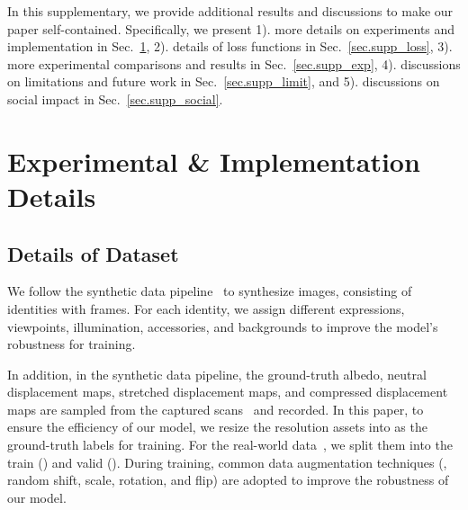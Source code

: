 


In this supplementary, we provide additional results and discussions to make our paper self-contained. Specifically, we present 1). more details on experiments and implementation in Sec.~\ref{sec.supp_imp}, 2). details of loss functions in Sec.~\ref{sec.supp_loss}, 3). more experimental comparisons and results in Sec.~\ref{sec.supp_exp}, 4). discussions on limitations and future work in Sec.~\ref{sec.supp_limit}, and 5). discussions on social impact in Sec.~\ref{sec.supp_social}.



\section{Experimental \& Implementation Details} \label{sec.supp_imp}


\subsection{Details of Dataset}

We follow the synthetic data pipeline~ to synthesize  images, consisting of  identities with  frames. For each identity, we assign different expressions, viewpoints, illumination, accessories, and backgrounds to improve the model's robustness for training.

In addition, in the synthetic data pipeline, the ground-truth albedo, neutral displacement maps, stretched displacement maps, and compressed displacement maps are sampled from the  captured scans~ and recorded. 
In this paper, to ensure the efficiency of our model, we resize the  resolution assets into  as the ground-truth labels for training. 
For the real-world data~, we split them into the train () and valid (). During training, common data augmentation techniques ({\ie}, random shift, scale, rotation, and flip) are adopted to improve the robustness of our model.


